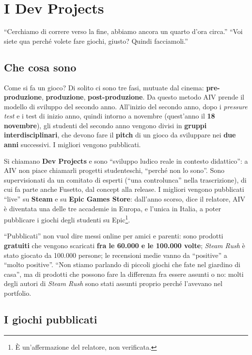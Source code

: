 \section{I Dev Projects}
\label{p1:sec:devprojects}

``Cerchiamo di correre verso la fine, abbiamo ancora un quarto d'ora
circa.'' ``Voi siete qua perché volete fare giochi, giusto? Quindi
facciamoli.''

\subsection{Che cosa sono}

Come si fa un gioco? Di solito ci sono tre fasi, mutuate dal cinema:
\textbf{pre-produzione}, \textbf{produzione}, \textbf{post-produzione}. Da
questo metodo AIV prende il modello di sviluppo del secondo anno.
All'inizio del secondo anno, dopo i \emph{pressure test} e i test di inizio
anno, quindi intorno a novembre (quest'anno il \textbf{18 novembre}), gli
studenti del secondo anno vengono divisi in \textbf{gruppi
interdisciplinari}, che devono fare il \textbf{pitch} di un gioco da
sviluppare nei \textbf{due anni} successivi. I migliori vengono pubblicati.

Si chiamano \textbf{Dev Projects} e sono ``sviluppo ludico reale in contesto
didattico'': a AIV non piace chiamarli progetti studenteschi, ``perché non
lo sono''. Sono supervisionati da un comitato di esperti (``una
controlunca'' nella trascrizione), di cui fa parte anche Fusetto, dal
concept alla release. I migliori vengono pubblicati ``live'' su
\textbf{Steam} e su \textbf{Epic Games Store}: dall'anno scorso, dice il
relatore, AIV è diventata una delle tre accademie in Europa, e l'unica in
Italia, a poter pubblicare i giochi degli studenti su Epic\footnote{È
un'affermazione del relatore, non verificata.}.

``Pubblicati'' non vuol dire messi online per amici e parenti: sono
prodotti \textbf{gratuiti} che vengono scaricati \textbf{fra le 60.000 e le
100.000 volte}; \emph{Steam Rush} è stato giocato da 100.000 persone; le
recensioni medie vanno da ``positive'' a ``molto positive''. ``Non stiamo
parlando di piccoli giochi che fate nel giardino di casa'', ma di prodotti
che possono fare la differenza fra essere assunti o no: molti degli autori
di \emph{Steam Rush} sono stati assunti proprio perché l'avevano nel
portfolio.

\subsection{I giochi pubblicati}

